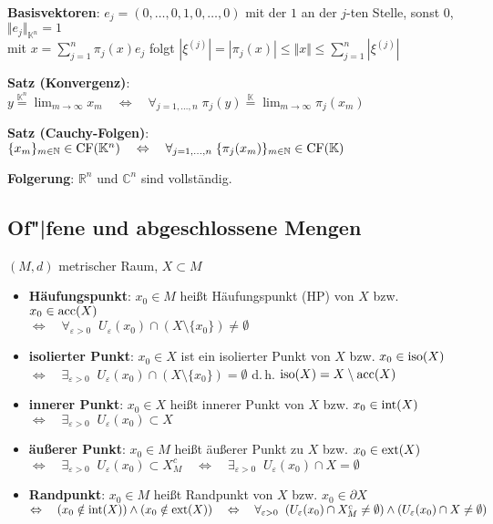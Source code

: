 \textbf{Basisvektoren}: $e_j = (0, \ldots, 0, 1, 0, \ldots, 0)$ mit der $1$
an der $j$-ten Stelle, sonst $0$, $\Vert e_j \Vert_{\mathbb{K}^n} = 1$ \\
mit $x = \sum_{j=1}^n \pi_j(x) e_j$ folgt
$|\xi^{(j)}| = |\pi_j(x)| \le \Vert x \Vert \le \sum_{j=1}^n |\xi^{(j)}|$

\textbf{Satz (Konvergenz)}:
$y \overset{\mathbb{K}^n}{=} \lim_{m \to \infty} x_m \quad\Leftrightarrow\quad
\forall_{j=1,\ldots,n}\; \pi_j(y) \overset{\mathbb{K}}{=}
\lim_{m \to \infty} \pi_j(x_m)$

\textbf{Satz (Cauchy-Folgen)}:
$\{x_m\}_{m \in \mathbb{N}} \in \operatorname{CF}(\mathbb{K}^n)
\quad\Leftrightarrow\quad
\forall_{j=1,\ldots,n}\; \{\pi_j(x_m)\}_{m \in \mathbb{N}} \in
\operatorname{CF}(\mathbb{K})$

\textbf{Folgerung}: $\mathbb{R}^n$ und $\mathbb{C}^n$ sind vollständig.

\subsection{%
    Of"|fene und abgeschlossene Mengen%
}

$(M,d)$ metrischer Raum, $X \subset M$

\begin{itemize}
    \item \textbf{Häufungspunkt}:
    $x_0 \in M$ heißt Häufungspunkt (HP) von $X$ bzw. $x_0 \in \operatorname{acc}(X)$ \\
    $\Leftrightarrow\quad \forall_{\varepsilon > 0}\;\;
    U_\varepsilon(x_0) \cap (X \setminus \{x_0\}) \not= \emptyset$

    \item \textbf{isolierter Punkt}:
    $x_0 \in X$ ist ein isolierter Punkt von $X$ bzw. $x_0 \in \operatorname{iso}(X)$ \\
    $\Leftrightarrow\quad \exists_{\varepsilon > 0}\;\;
    U_\varepsilon(x_0) \cap (X \setminus \{x_0\}) = \emptyset$
    \qquad d.\,h. $\operatorname{iso}(X) = X \setminus \operatorname{acc}(X)$

    \item \textbf{innerer Punkt}:
    $x_0 \in X$ heißt innerer Punkt von $X$ bzw. $x_0 \in \operatorname{int}(X)$ \\
    $\Leftrightarrow\quad
    \exists_{\varepsilon > 0}\;\; U_\varepsilon(x_0) \subset X$

    \item \textbf{äußerer Punkt}:
    $x_0 \in M$ heißt äußerer Punkt zu $X$ bzw. $x_0 \in \operatorname{ext}(X)$ \\
    $\Leftrightarrow\quad
    \exists_{\varepsilon > 0}\;\; U_\varepsilon(x_0) \subset X_M^c
    \quad\Leftrightarrow\quad
    \exists_{\varepsilon > 0}\;\; U_\varepsilon(x_0) \cap X = \emptyset$

    \item \textbf{Randpunkt}:
    $x_0 \in M$ heißt Randpunkt von $X$ bzw. $x_0 \in \partial X$ \\
    $\Leftrightarrow\quad
    (x_0 \notin \operatorname{int}(X)) \land (x_0 \notin \operatorname{ext}(X))
    \quad\Leftrightarrow\quad \forall_{\varepsilon > 0}\;\;
    (U_\varepsilon(x_0) \cap X_M^c \not= \emptyset) \land
    (U_\varepsilon(x_0) \cap X \not= \emptyset)$
\end{itemize}

